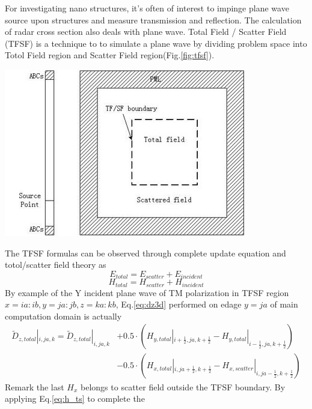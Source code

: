 For investigating nano structures, it's often of interest to impinge plane wave source upon structures and measure
transmission and reflection. The calculation of radar cross section also deals with plane wave. Total Field / Scatter
Field (TFSF) is a technique to to simulate a plane wave by dividing problem space into Totol Field region and Scatter
Field region(Fig.\ref{fig:tfsf}).
\begin{center}\label{fig:tfsf}
\includegraphics[scale=0.5]{images/tfsf.jpg}
\end{center}
The TFSF formulas can be observed through complete update equation and totol/scatter field theory as
\begin{displaymath}\label{eq:e_ts}
  E_{total}=E_{scatter}+E_{incident}
\end{displaymath}
\begin{displaymath}\label{eq:h_ts}
  H_{total}=H_{scatter}+H_{incident}  
\end{displaymath}
By example of the Y incident plane wave of TM polarization in TFSF region $x=ia:ib, y=ja:jb, z=ka:kb$, Eq.\ref{eq:dz3d}
performed on edage $y=ja$ of main computation domain is actually 
\begin{equation}
  \begin{split}
    \widetilde{D}_{z,total}|_{i,ja,k} = \widetilde{D}_{z,total}|_{i,ja,k} &+ 0.5 \cdot \left( H_{y,total}|_{i+\frac{1}{2},ja,k+\frac{1}{2}} - H_{y,total}|_{i-\frac{1}{2},ja,k+\frac{1}{2}} \right) \\
    &- 0.5 \cdot \left( H_{x,total}|_{i,ja+\frac{1}{2},k+\frac{1}{2}} - H_{x,scatter}|_{i,ja-\frac{1}{2},k+\frac{1}{2}} \right)    
  \end{split}
\end{equation}
Remark the last $H_x$ belongs to scatter field outside the TFSF boundary. By applying Eq.\ref{eq:h_ts} to complete the

